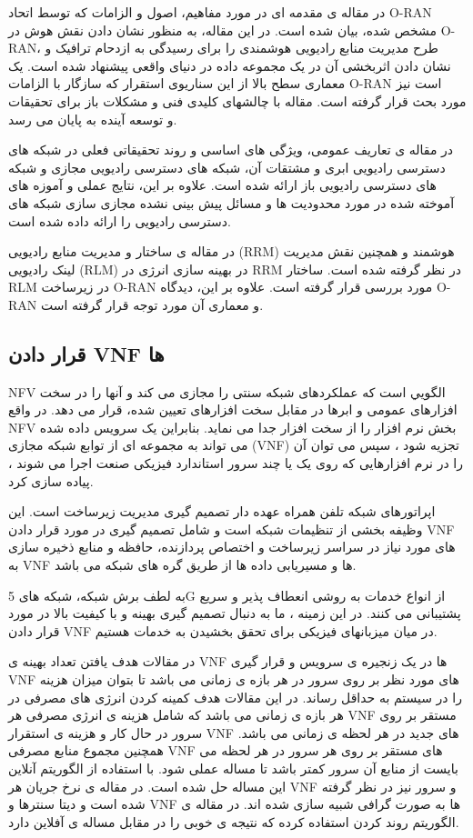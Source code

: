در مقاله ی 
\cite{oranInt}
 مقدمه ای در مورد مفاهیم، اصول و الزامات  که توسط اتحاد O-RAN مشخص شده، بیان شده است.
 در این مقاله،
 به منظور نشان دادن نقش هوش در O-RAN، طرح مدیریت منابع رادیویی هوشمندی را برای رسیدگی به ازدحام ترافیک و نشان دادن اثربخشی آن در یک مجموعه داده در دنیای واقعی پیشنهاد شده است.
 یک معماری سطح بالا از این سناریوی استقرار که سازگار با الزامات O-RAN است نیز مورد بحث قرار گرفته است. مقاله با چالشهای کلیدی فنی و مشکلات باز برای تحقیقات و توسعه آینده به پایان می رسد.
 
در مقاله ی
\cite{c2o}
تعاریف عمومی، ویژگی های اساسی و روند تحقیقاتی فعلی در شبکه های دسترسی رادیویی ابری و مشتقات آن، شبکه های دسترسی رادیویی مجازی و شبکه های دسترسی رادیویی باز ارائه شده است.
علاوه بر این، نتایج عملی و آموزه های آموخته شده در مورد محدودیت ها و مسائل پیش بینی نشده مجازی سازی شبکه های دسترسی رادیویی را ارائه داده شده است.

در مقاله ی 
\cite{sree2019open, kawahara2019ran}
 ساختار و مدیریت منابع رادیویی (RRM) هوشمند 
 و همچنین نقش مدیریت لینک رادیویی (RLM) در بهینه سازی انرژی در RRM
در نظر گرفته شده است.
ساختار RLM در 
زیرساخت O-RAN مورد بررسی قرار گرفته است.
علاوه بر این، دیدگاه
O-RAN
 و معماری آن مورد توجه قرار گرفته است.
\subsection{قرار دادن VNF ها}
NFV
 الگویي است که عملکردهای شبکه سنتی را مجازی می کند و آنها را در سخت افزارهای عمومی و ابرها در مقابل سخت افزارهای تعیین شده، قرار می دهد.
 در واقع NFV بخش نرم افزار را از سخت افزار جدا می نماید.
 بنابراین یک سرویس داده شده می تواند به مجموعه ای از توابع شبکه مجازی (VNF) تجزیه شود ، سپس می توان آن را در نرم افزارهایی که روی یک یا چند سرور استاندارد فیزیکی صنعت اجرا می شوند ، پیاده سازی کرد.
 
اپراتورهای شبکه تلفن همراه عهده دار تصمیم گیری مدیریت زیرساخت است.
این وظیفه بخشی از تنظیمات شبکه است و شامل تصمیم گیری در مورد قرار دادن VNF های مورد نیاز در سراسر زیرساخت و اختصاص پردازنده، حافظه و منابع ذخیره سازی به VNF ها و مسیریابی داده ها از طریق گره های شبکه
می باشد.

به لطف برش شبکه، شبکه های 5G از انواع خدمات به روشی انعطاف پذیر و سریع پشتیبانی می کنند. در این زمینه ، ما به دنبال تصمیم گیری بهینه و با کیفیت بالا در مورد قرار دادن VNF در میان میزبانهای فیزیکی برای تحقق بخشیدن به خدمات هستیم.

در مقالات
\cite{wang2016online,jia2018online,luo2020online}
هدف یافتن تعداد بهینه ی VNF ها در یک زنجیره ی سرویس و قرار گیری VNF های مورد نظر بر روی سرور در هر بازه ی زمانی می باشد تا بتوان میزان هزینه را در سیستم به حداقل رساند.
در این مقالات هدف کمینه کردن انرژی های مصرفی در هر بازه ی زمانی می باشد که شامل هزینه ی انرژی مصرفی هر VNF مستقر بر روی سرور در حال کار و هزینه ی استقرار VNF های جدید در هر لحظه ی زمانی می باشد.
همچنین مجموع منابع مصرفی VNF های مستقر بر روی هر سرور در هر لحظه می بایست از منابع آن سرور کمتر باشد تا مساله عملی شود.
با استفاده از الگوریتم آنلاین این مساله حل شده است.
در مقاله ی 
\cite{jia2018online,luo2020online}
نرخ جریان هر VNF و سرور نیز در نظر گرفته شده است و دیتا سنترها و VNF ها به صورت گرافی شبیه سازی شده اند.
در مقاله ی
\cite{luo2020online}
الگوریتم روند کردن استفاده کرده که نتیجه ی خوبی را در مقابل مساله ی آفلاین دارد.

